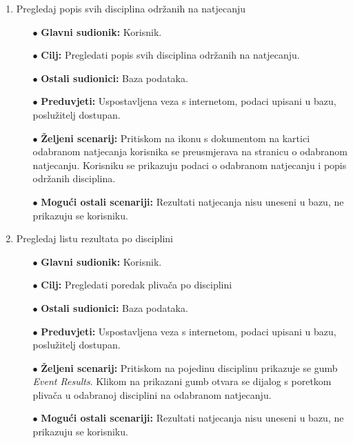 \documentclass[times, utf8, zavrsni]{fer}
\begin{document}
\begin{enumerate}
    \item Pregledaj popis svih disciplina održanih na natjecanju
    \begin{itemize}
        \item[$\bullet$] \textbf{Glavni sudionik:} Korisnik.
        \item[$\bullet$] \textbf{Cilj:} Pregledati popis svih disciplina održanih na natjecanju.
        \item[$\bullet$] \textbf{Ostali sudionici:} Baza podataka.
        \item[$\bullet$] \textbf{Preduvjeti:} Uspostavljena veza s internetom, podaci upisani u bazu, poslužitelj dostupan.
        \item[$\bullet$] \textbf{Željeni scenarij:} Pritiskom na ikonu s dokumentom na kartici odabranom natjecanja korisnika se preusmjerava na stranicu o odabranom
        natjecanju. Korisniku se prikazuju podaci o odabranom natjecanju i popis održanih disciplina.
        \item[$\bullet$] \textbf{Mogući ostali scenariji:} Rezultati natjecanja nisu uneseni u bazu, ne prikazuju se korisniku.
    \end{itemize}


    \item Pregledaj listu rezultata po disciplini
    \begin{itemize}
        \item[$\bullet$] \textbf{Glavni sudionik:} Korisnik.
        \item[$\bullet$] \textbf{Cilj:} Pregledati poredak plivača po disciplini
        \item[$\bullet$] \textbf{Ostali sudionici:} Baza podataka.
        \item[$\bullet$] \textbf{Preduvjeti:} Uspostavljena veza s internetom, podaci upisani u bazu, poslužitelj dostupan.
        \item[$\bullet$] \textbf{Željeni scenarij:} Pritiskom na pojedinu disciplinu prikazuje se gumb \textit{Event Results}. Klikom na prikazani gumb otvara
        se dijalog s poretkom plivača u odabranoj disciplini na odabranom natjecanju.
        \item[$\bullet$] \textbf{Mogući ostali scenariji:} Rezultati natjecanja nisu uneseni u bazu, ne prikazuju se korisniku.
    \end{itemize}



\end{enumerate}
\end{document}
